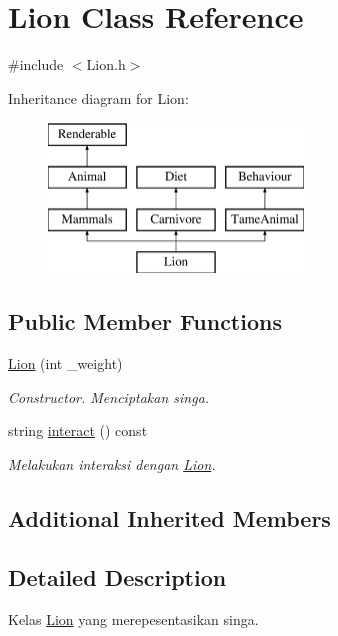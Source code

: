 \hypertarget{classLion}{\section{Lion Class Reference}
\label{classLion}
}


{\ttfamily \#include $<$Lion.\+h$>$}

Inheritance diagram for Lion\+:\begin{figure}[H]
\begin{center}
\leavevmode
\includegraphics[height=4.000000cm]{classLion}
\end{center}
\end{figure}
\subsection*{Public Member Functions}
\begin{DoxyCompactItemize}
\item 
\hypertarget{classLion_ab3f1740ebe2231032526f410fee4d14c}{\hyperlink{classLion_ab3f1740ebe2231032526f410fee4d14c}{Lion} (int \+\_\+weight)}\label{classLion_ab3f1740ebe2231032526f410fee4d14c}

\begin{DoxyCompactList}\small\item\em Constructor. Menciptakan singa. \end{DoxyCompactList}\item 
string \hyperlink{classLion_ae05ecf4aed9b949f855bec4285c96600}{interact} () const 
\begin{DoxyCompactList}\small\item\em Melakukan interaksi dengan \hyperlink{classLion}{Lion}. \end{DoxyCompactList}\end{DoxyCompactItemize}
\subsection*{Additional Inherited Members}


\subsection{Detailed Description}
Kelas \hyperlink{classLion}{Lion} yang merepesentasikan singa. 

